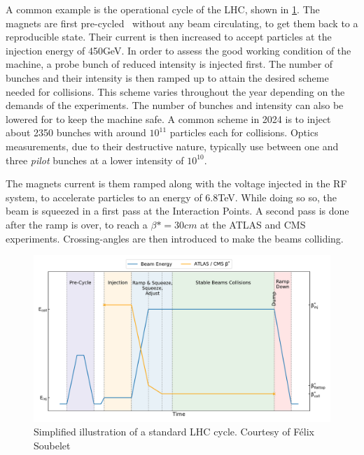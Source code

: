 A common example is the operational cycle of the LHC, shown in \cref{fig:cern_complex:cycle}.
The magnets are first pre-cycled~\cite{bottura_pre-cycles_2010} without any beam circulating, to get
them back to a reproducible state. Their current is then increased to accept particles at the 
injection energy of 450GeV. In order to assess the good working condition of the machine, a probe
bunch of reduced intensity is injected first. The number of bunches and their intensity is then
ramped up to attain the desired scheme needed for collisions. This scheme varies throughout the year
depending on the demands of the experiments. The number of bunches and intensity can also be lowered
for to keep the machine safe. A common scheme in 2024 is to inject about 2350 bunches with around
$10^{11}$ particles each for collisions.
Optics measurements, due to their destructive nature, typically use between one and three
\textit{pilot} bunches at a lower intensity of $10^{10}$.

The magnets current is them ramped along with the voltage injected in the RF system, to 
accelerate particles to an energy of 6.8TeV. While doing so so, the beam is squeezed in a first pass
at the Interaction Points. A second pass is done after the ramp is over, to reach a $\beta* = 30cm$
at the ATLAS and CMS experiments. Crossing-angles are then introduced to make the beams colliding.

\begin{figure}[!htb]
    \includegraphics[width=\textwidth]{./images/lhc_cycle.pdf}
    \caption{Simplified illustration of a standard LHC cycle. Courtesy of Félix
    Soubelet~\cite{felix_soubelet_local_2023}} \label{fig:cern_complex:cycle}
\end{figure}


